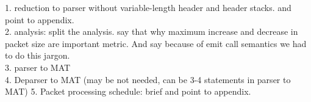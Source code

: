 \documentclass[letterpaper,twocolumn,10pt]{article}
\begin{document}
1. reduction to parser without variable-length header and  header 
stacks. and point to appendix.\\
2. analysis: split the analysis. say that why maximum increase and 
decrease in packet size are important metric. And say because of 
emit call semantics we had to do this jargon.\\
3. parser to MAT \\
4. Deparser to MAT (may be not needed, can be 3-4 statements in 
parser to MAT)
5. Packet processing schedule: brief and point to appendix.

% 
\end{document}
